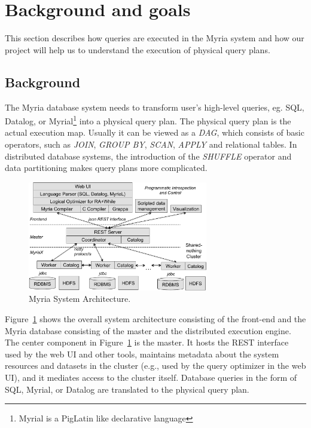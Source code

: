 \documentclass[11pt]{scrartcl}
\begin{document}
\section{Background and goals}

This section describes how queries are executed in the Myria system and how our project will help us to understand the execution of physical query plans.


\subsection{Background}
\label{sec:background}

The Myria database system needs to transform user's high-level queries, eg. SQL, Datalog, or Myrial\footnote{Myrial is a PigLatin like declarative language} into a physical query plan. The physical query plan is the actual execution map. Usually it can be viewed as a \emph{DAG}, which consists of basic operators, such as \emph{JOIN}, \emph{GROUP BY}, \emph{SCAN}, \emph{APPLY} and relational tables. In distributed database systems, the introduction of the \emph{SHUFFLE} operator and data partitioning makes query plans more complicated.

\begin{figure}
 \begin{center}
     \includegraphics[width=0.7\textwidth]{arch}
   \end{center}
  \caption{Myria System Architecture.}
  \label{fig:myria_arc}
\end{figure}

Figure~\ref{fig:myria_arc} shows the overall system architecture consisting of the front-end and the Myria database consisting of the master and the distributed execution engine. The center component in Figure~\ref{fig:myria_arc} is the master. It hosts the REST interface used by the web UI and other tools, maintains metadata about the system resources and datasets in the cluster (e.g., used by the query optimizer in the web UI), and it mediates access to the cluster itself. Database queries in the form of SQL, Myrial, or Datalog are translated to the physical query plan.
\end{document}

